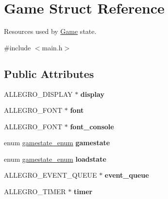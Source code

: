 \hypertarget{structGame}{\section{\-Game \-Struct \-Reference}
\label{structGame}
}


\-Resources used by \hyperlink{structGame}{\-Game} state.  




{\ttfamily \#include $<$main.\-h$>$}

\subsection*{\-Public \-Attributes}
\begin{DoxyCompactItemize}
\item 
\hypertarget{structGame_a2bf8ece79fe05b03c31f2e2ede42e5f5}{\-A\-L\-L\-E\-G\-R\-O\-\_\-\-D\-I\-S\-P\-L\-A\-Y $\ast$ {\bfseries display}}\label{structGame_a2bf8ece79fe05b03c31f2e2ede42e5f5}

\item 
\hypertarget{structGame_a455bfdaacd5f2bda80b640c02ec3250e}{\-A\-L\-L\-E\-G\-R\-O\-\_\-\-F\-O\-N\-T $\ast$ {\bfseries font}}\label{structGame_a455bfdaacd5f2bda80b640c02ec3250e}

\item 
\hypertarget{structGame_a54cb413a722ca2b663b77f75ba819f2d}{\-A\-L\-L\-E\-G\-R\-O\-\_\-\-F\-O\-N\-T $\ast$ {\bfseries font\-\_\-console}}\label{structGame_a54cb413a722ca2b663b77f75ba819f2d}

\item 
\hypertarget{structGame_a5118a01ee6bb74fb41e8e8880a5b85a2}{enum \hyperlink{main_8h_ae1e9f94402d151ae1adc212237a6d153}{gamestate\-\_\-enum} {\bfseries gamestate}}\label{structGame_a5118a01ee6bb74fb41e8e8880a5b85a2}

\item 
\hypertarget{structGame_a026bb8ebb6454c0d87dea503eafa9197}{enum \hyperlink{main_8h_ae1e9f94402d151ae1adc212237a6d153}{gamestate\-\_\-enum} {\bfseries loadstate}}\label{structGame_a026bb8ebb6454c0d87dea503eafa9197}

\item 
\hypertarget{structGame_a820782e408ff7a704dc12af67eb0c44f}{\-A\-L\-L\-E\-G\-R\-O\-\_\-\-E\-V\-E\-N\-T\-\_\-\-Q\-U\-E\-U\-E $\ast$ {\bfseries event\-\_\-queue}}\label{structGame_a820782e408ff7a704dc12af67eb0c44f}

\item 
\hypertarget{structGame_a8d6d4f06c6412d085112cd007977d868}{\-A\-L\-L\-E\-G\-R\-O\-\_\-\-T\-I\-M\-E\-R $\ast$ {\bfseries timer}}\label{structGame_a8d6d4f06c6412d085112cd007977d868}


\end{DoxyCompactItemize}
